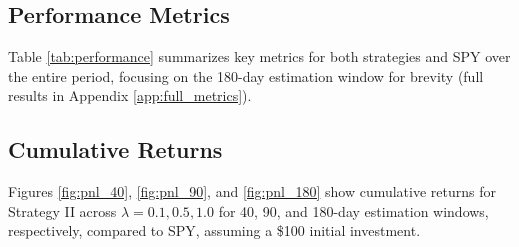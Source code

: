 \documentclass[12pt]{article}
\begin{document}
\subsection{Performance Metrics}
Table \ref{tab:performance} summarizes key metrics for both strategies and SPY over the entire period, focusing on the 180-day estimation window for brevity (full results in Appendix \ref{app:full_metrics}).

\begin{table}[H]
\centering
\caption{Performance Metrics (180-day Estimation, Whole Period)}
\label{tab:performance}
\end{table}

\subsection{Cumulative Returns}
Figures \ref{fig:pnl_40}, \ref{fig:pnl_90}, and \ref{fig:pnl_180} show cumulative returns for Strategy II across $\lambda = 0.1, 0.5, 1.0$ for 40, 90, and 180-day estimation windows, respectively, compared to SPY, assuming a \$100 initial investment.
\end{document}

